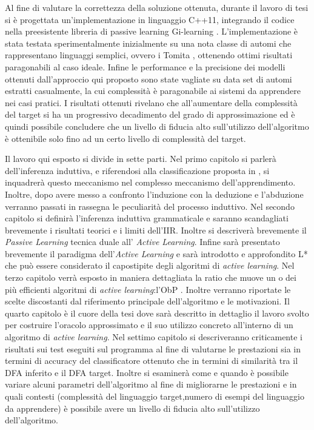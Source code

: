 Al fine di valutare la correttezza della soluzione ottenuta, durante il lavoro di tesi si è progettata un'implementazione in linguaggio C++11, integrando il codice nella preesistente libreria di passive learning Gi-learning \cite{Cot16}. L'implementazione è stata testata sperimentalmente inizialmente su una nota classe di automi che rappresentano linguaggi semplici, ovvero i Tomita \cite{Tomita82, Dupont94}, ottenendo ottimi risultati paragonabili al caso ideale.
Infine le performance e la precisione dei modelli ottenuti dall'approccio qui proposto sono state vagliate su data set di automi estratti casualmente, la cui complessità è paragonabile ai sistemi da apprendere nei casi pratici. I risultati ottenuti rivelano che all'aumentare della complessità del target si ha un progressivo decadimento del grado di approssimazione ed è quindi possibile concludere che un livello di fiducia alto sull'utilizzo dell'algoritmo è ottenibile solo fino ad un certo livello di complessità del target.

Il lavoro qui esposto si divide in sette parti. Nel primo capitolo si parlerà dell'inferenza induttiva, e riferendosi alla classificazione proposta in \cite{Mic86a}, si inquadrerà questo meccanismo nel complesso meccanismo dell'apprendimento.
Inoltre, dopo avere messo a confronto l'induzione con la deduzione e l'abduzione verranno passati in rassegna le peculiarità del processo induttivo.
Nel secondo capitolo si definirà l'inferenza induttiva grammaticale e saranno scandagliati brevemente i risultati teorici e i limiti dell'\ac{IIR}. Inoltre si descriverà brevemente il \textit{Passive Learning} tecnica duale all' \textit{Active Learning}. Infine sarà presentato brevemente il paradigma dell'\textit{Active Learning} e sarà introdotto e approfondito L* \cite{Angluin87} che può essere considerato il capostipite degli algoritmi di \textit{active learning}.
Nel terzo capitolo verrà esposto in maniera dettagliata la ratio che muove un o dei più efficienti algoritmi di \textit{active learning}:l'\ac{ObP} . Inoltre verranno riportate le scelte discostanti dal riferimento principale dell'algoritmo \cite{Howar12} e le motivazioni.
Il quarto capitolo è il cuore della tesi dove sarà descritto in dettaglio il lavoro  svolto per costruire l'oracolo approssimato e il suo utilizzo concreto all'interno di un algoritmo di \textit{active learning}.
Nel settimo capitolo si descriveranno criticamente i risultati sui test eseguiti sul programma al fine di valutarne le prestazioni sia in termini di accuracy del classificatore ottenuto che in termini di similarità tra il \ac{DFA} inferito e il \ac{DFA} target. Inoltre si esaminerà come e quando è possibile variare alcuni parametri dell'algoritmo al fine di migliorarne le prestazioni e in quali contesti (complessità del linguaggio target,numero di esempi del linguaggio da apprendere) è possibile avere un livello di fiducia alto sull'utilizzo dell'algoritmo. 
